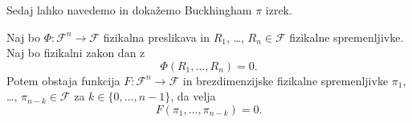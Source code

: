 \documentclass[mat2, tisk]{fmfdelo}
\begin{document}
Sedaj lahko navedemo in dokažemo Buckhingham $\pi$ izrek.

 \begin{izrek}[Buckhingham $\pi$]
 Naj bo $\Phi: \mathcal{F}^n \rightarrow \mathcal{F}$ fizikalna preslikava in 
 $R_1$, \dots, $R_n \in \mathcal{F}$ fizikalne spremenljivke. Naj bo fizikalni zakon dan z 
 \begin{equation}
 \Phi(R_1, \dots, R_n) = 0.
 \end{equation}
 Potem obstaja funkcija 
 $F: \mathcal{F}^n \rightarrow \mathcal{F}$ in brezdimenzijske fizikalne spremenljivke 
 $\pi_1$, \dots, $\pi_{n-k} \in \mathcal{F}$ za $k \in \{0, \dots, n-1\}$, da velja
 \begin{equation}
   F(\pi_1, \dots, \pi_{n-k}) = 0.
 \end{equation}
 \end{izrek}
\end{document}
